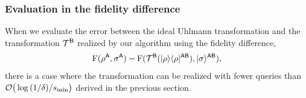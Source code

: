 




\subsubsection{Evaluation in the fidelity difference}
\label{sec:uhlfidquery}



When we evaluate the error between the ideal Uhlmann transformation and the transformation ${\mathcal{T}}^{\mathsf{B}}$ realized by our algorithm using the fidelity difference,
\begin{align}
    {\mathrm{F}}(\rho^{\mathsf{A}}, \sigma^{\mathsf{A}}) - {\mathrm{F}}({\mathcal{T}}^{\mathsf{B}}(|\rho\rangle\langle\rho|^{{\mathsf{A}}{\mathsf{B}}}), |\sigma\rangle^{{\mathsf{A}}{\mathsf{B}}}),
\end{align}
there is a case where the transformation can be realized with fewer queries than ${\mathcal{O}}\big(\log{(1/\delta)/s_{\rm min}}\big)$ derived in the previous section.


